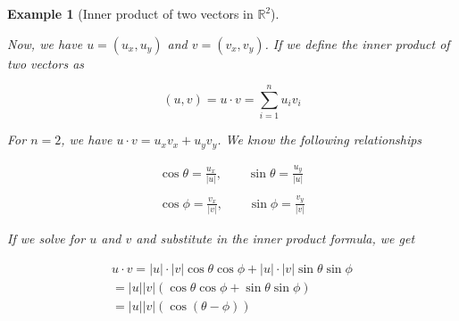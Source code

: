 \documentclass{book}
\newtheorem{example}{Example}[chapter]
\begin{document}
\begin{example}[Inner product of two vectors in $\mathbb{R}^{2}$]

    \begin{center}
    \end{center}

    Now, we have $u=\left(u_{x},u_{y}\right)$ and $v=\left(v_x, v_y\right)$. If we
    define the inner product of two vectors as

    \[
        \left(u,v\right) = u \cdot v = \sum_{i=1}^{n}{u_i v_i}
    \]

    For $n=2$, we have $u \cdot v = u_x v_x + u_y v_y$. We know the following
    relationships

    \begin{equation}
        \begin{split}
            \cos{\theta} = \frac{u_x}{|u|},\qquad
            \sin{\theta} = \frac{u_y}{|u|}
            \\\\
            \cos{\phi} = \frac{v_x}{|v|},\qquad
            \sin{\phi} = \frac{v_y}{|v|}
        \end{split}
    \end{equation}

    If we solve for $u$ and $v$ and substitute in the inner product formula, we get

    \begin{equation}
        \begin{split}
            u\cdot v = |u|\cdot|v|\cos\theta\cos\phi + |u|\cdot|v|\sin\theta\sin\phi
            \\ = |u||v|(\cos\theta\cos\phi + \sin\theta\sin\phi)
            \\ = |u||v|(\cos{\left(\theta - \phi\right)})
        \end{split}
    \end{equation}


\end{example}
\end{document}
